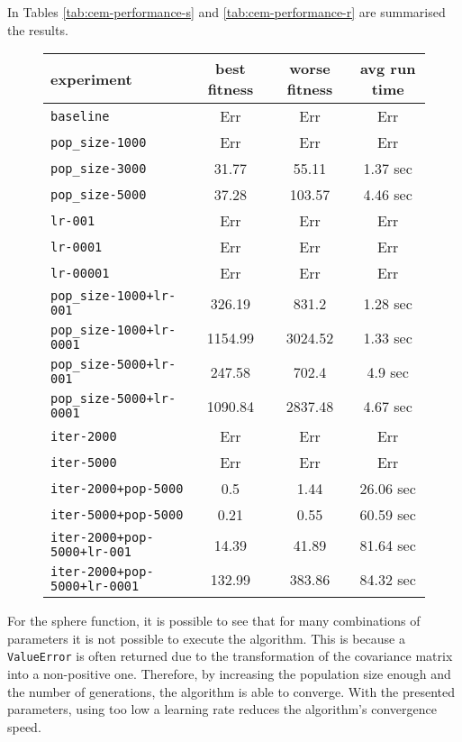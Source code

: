 In Tables \ref{tab:cem-performance-s} and \ref{tab:cem-performance-r} are summarised the results. 
\begin{figure}[htb]
	\centering
	
	\begin{tabular}{lccc}
		\toprule
		\textbf{experiment} & \textbf{best fitness} & \textbf{worse fitness} & \textbf{avg run time} \\
		\midrule
		\texttt{baseline 						}  &	   Err &	    Err &	       Err \\
		\texttt{pop\_size-1000 					}     &	   Err &	    Err &	       Err \\
		\texttt{pop\_size-3000 					}     &	 31.77 &	  55.11 &	  1.37 sec \\
		\texttt{pop\_size-5000 					}     &	 37.28 &	 103.57 &	  4.46 sec \\
		\texttt{lr-001 							}    &	   Err &	    Err &	       Err \\
		\texttt{lr-0001	 						}   &	   Err &	    Err &	       Err \\
		\texttt{lr-00001	 					}  &	   Err &	    Err &	       Err \\
		\texttt{pop\_size-1000+lr-001 			}   &	326.19 &	  831.2 &	  1.28 sec \\
		\texttt{pop\_size-1000+lr-0001 			}   &              1154.99 &	3024.52 &	  1.33 sec \\
		\texttt{pop\_size-5000+lr-001 			}   &	247.58 &	  702.4 &	   4.9 sec \\
		\texttt{pop\_size-5000+lr-0001 			}   &              1090.84 &	2837.48 &	  4.67 sec \\
		\texttt{iter-2000 						}   &	   Err &	    Err &	       Err \\
		\texttt{iter-5000 						}   &	   Err &	    Err &	       Err \\
		\texttt{iter-2000+pop-5000 	}			    &	   0.5 &	   1.44 &	 26.06 sec \\
		\texttt{iter-5000+pop-5000 	}			    &	  0.21 &	   0.55 &	 60.59 sec \\
		\texttt{iter-2000+pop-5000+lr-001 }		    &	 14.39 &	  41.89 &	 81.64 sec \\
		\texttt{iter-2000+pop-5000+lr-0001 }	    &	132.99 &	 383.86 &	 84.32 sec \\
		\bottomrule
	\end{tabular}
	\label{tab:nes-performance-s}
\end{figure}

For the sphere function, it is possible to see that for many combinations of parameters it is not possible to execute the algorithm. This is because a \texttt{ValueError} is often returned due to the transformation of the covariance matrix into a non-positive one.
Therefore, by increasing the population size enough and the number of generations, the algorithm is able to converge.
With the presented parameters, using too low a learning rate reduces the algorithm's convergence speed.
\bigskip

